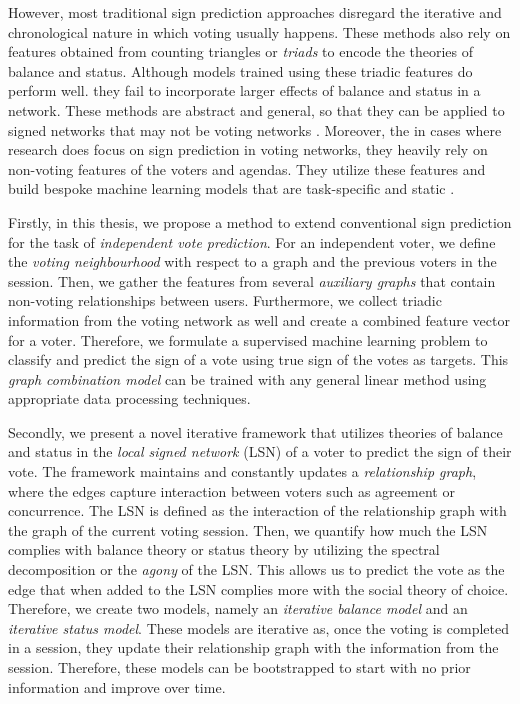 However, most traditional sign prediction approaches disregard the iterative and chronological nature in which voting usually happens.
These methods also rely on features obtained from counting triangles or \textit{triads} to encode the theories of balance and status.
Although models trained using these triadic features do perform well. they fail to incorporate larger effects of balance and status in a network.
These methods are abstract and general, so that they can be applied to signed networks that may not be voting networks \cite{agrawal2013link,khodadadi2017sign,Shuang-Hong2012Friend}.
Moreover, the in cases where research does focus on sign prediction in voting networks, they heavily rely on non-voting features of the voters and agendas.
They utilize these features and build bespoke machine learning models that are task-specific and static \cite{karimi2019multicongress,jankowski-lorek2013MBSN}.

Firstly, in this thesis, we propose a method to extend conventional sign prediction for the task of \textit{independent vote prediction}.
For an independent voter, we define the \textit{voting neighbourhood} with respect to a graph and the previous voters in the session.
Then, we gather the features from several \textit{auxiliary graphs} that contain non-voting relationships between users.
Furthermore, we collect triadic information from the voting network as well and create a combined feature vector for a voter.
Therefore, we formulate a supervised machine learning problem to classify and predict the sign of a vote using true sign of the votes as targets.
This \textit{graph combination model} can be trained with any general linear method using appropriate data processing techniques.

Secondly, we present a novel iterative framework that utilizes theories of balance and status in the \textit{local signed network} (LSN) of a voter to predict the sign of their vote.
The framework maintains and constantly updates a \textit{relationship graph}, where the edges capture interaction between voters such as agreement or concurrence.
The LSN is defined as the interaction of the relationship graph with the graph of the current voting session.
Then, we quantify how much the LSN complies with balance theory or status theory by utilizing the spectral decomposition or the \textit{agony} of the LSN.
This allows us to predict the vote as the edge that when added to the LSN complies more with the social theory of choice.
Therefore, we create two models, namely an \textit{iterative balance model} and an \textit{iterative status model}.
These models are iterative as, once the voting is completed in a session, they update their relationship graph with the information from the session.
Therefore, these models can be bootstrapped to start with no prior information and improve over time.

